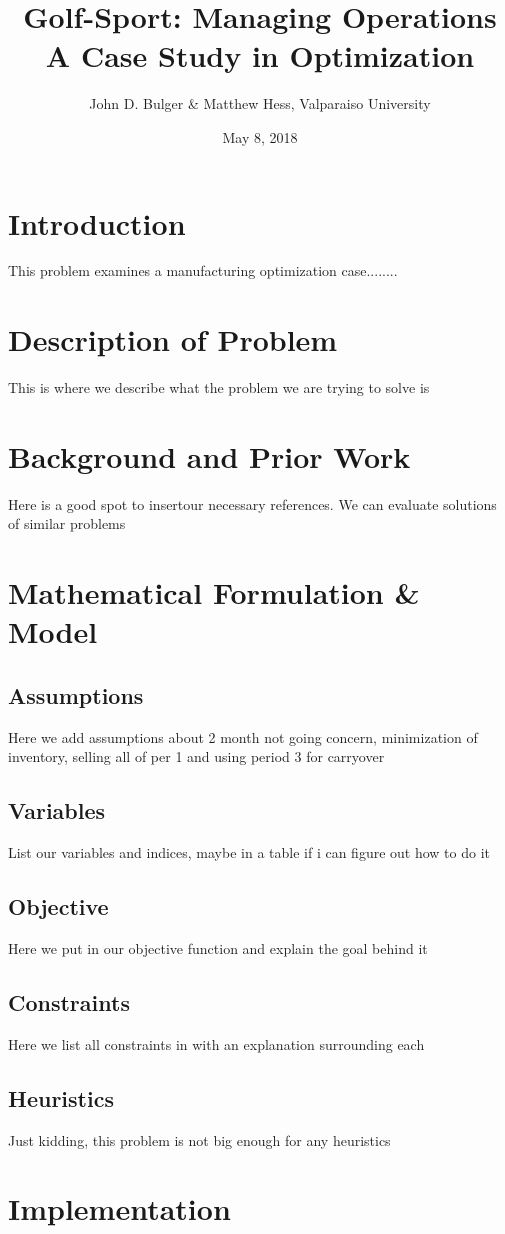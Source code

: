 \documentclass{article}
\title{Golf-Sport:  Managing Operations \\ A Case Study in Optimization}
\date{May 8, 2018}
\author{John D. Bulger \& Matthew Hess, Valparaiso University}
\begin{document}
	\maketitle
	\newpage
\section{Introduction}
This problem examines a manufacturing optimization case........
\section{Description of Problem}
This is where we describe what the problem we are trying to solve is
\section{Background and Prior Work}
Here is a good spot to insertour necessary references.  We can evaluate solutions of similar problems
\section{Mathematical Formulation \& Model}
\subsection{Assumptions}
Here we add assumptions about 2 month not going concern, minimization of inventory, selling all of per 1 and using period 3 for carryover
\subsection{Variables}
List our variables and indices, maybe in a table if i can figure out how to do it
\subsection{Objective}
Here we put in our objective function and explain the goal behind it
\subsection{Constraints}
Here we list all constraints in with an explanation surrounding each
\subsection{Heuristics}
Just kidding, this problem is not big enough for any heuristics
\section{Implementation}
\end{document}
